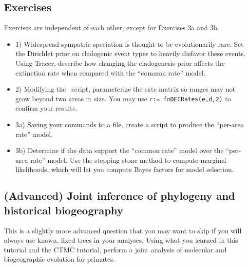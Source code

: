 \subsection{Exercises}

Exercises are independent of each other, except for Exercises 3a and 3b.

\begin{itemize}
\item 1) Widespread sympatric speciation is thought to be evolutionarily rare. Set the Dirichlet prior on cladogenic event types to heavily disfavor these events. Using Tracer, describe how changing the cladogenesis prior affects the extinction rate when compared with the ``common rate'' model.
\item 2) Modifying the \RevBayes~script, parameterize the rate matrix so ranges may not grow beyond two areas in size. You may use {\tt r:= fnDECRates(e,d,2)} to confirm your results.
\item 3a) Saving your commands to a file, create a script to produce the ``per-area rate'' model.
\item 3b) Determine if the data support the ``common rate'' model over the ``per-area rate'' model. Use the stepping stone method to compute marginal likelihoods, which will let you compute Bayes factors for model selection.
\end{itemize}

\subsection{(Advanced) Joint inference of phylogeny and historical biogeography}
This is a slightly more advanced question that you may want to skip if you will always use known, fixed trees in your analyses.
Using what you learned in this tutorial and the CTMC tutorial, perform a joint analysis of molecular and biogeographic evolution for primates. 

